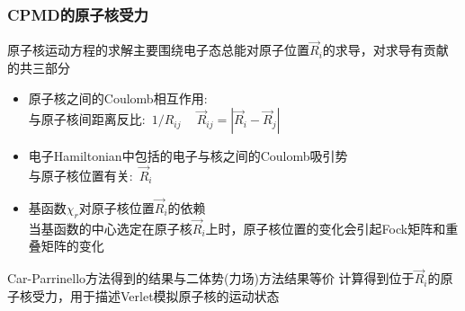 %
\frame
{
	\frametitle{\textrm{CPMD}的原子核受力}
	原子核运动方程的求解主要围绕电子态总能对原子位置$\vec R_i$的求导，对求导有贡献的共三部分
	\begin{itemize}
		\item 原子核之间的\textrm{Coulomb}相互作用:\\
			与原子核间距离反比:~$1/R_{ij}~\quad\vec R_{ij}=|\vec R_i-\vec R_j|$
		\item 电子\textrm{Hamiltonian}中包括的电子与核之间的\textrm{Coulomb}吸引势\\
			与原子核位置有关:~$\vec R_i$
		\item 基函数$\chi_r$对原子核位置$\vec R_i$的依赖\\
			当基函数的中心选定在原子核$\vec R_i$上时，原子核位置的变化会引起\textrm{Fock}矩阵和重叠矩阵的变化\\
	{\fontsize{7.2pt}{5.2pt}}
	\end{itemize}
	\textrm{Car-Parrinello}方法得到的结果与二体势(力场)方法结果等价
	\vskip 5pt
	计算得到位于$\vec R_i$的原子核受力，用于描述\textrm{Verlet}模拟原子核的运动状态
}

